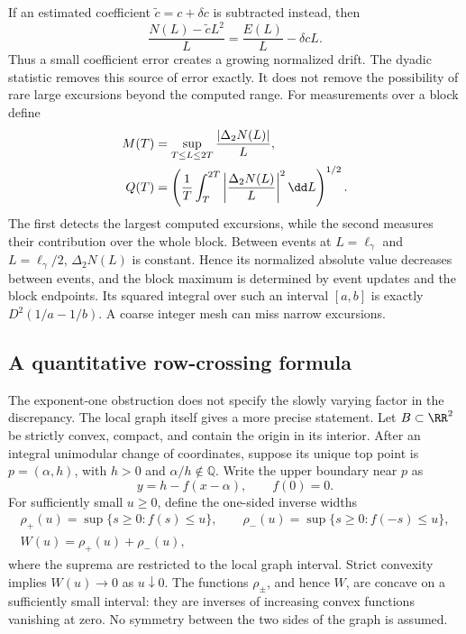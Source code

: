 If an estimated coefficient $\widetilde c=c+\delta c$ is subtracted
instead, then
\[
 \frac{N(L)-\widetilde cL^2}{L}
 =\frac{E(L)}L-\delta cL.
\]
Thus a small coefficient error creates a growing normalized drift. The
dyadic statistic removes this source of error exactly. It does not
remove the possibility of rare large excursions beyond the computed range.
For measurements over a block define
\begin{align}
 M(T)&=\sup_{T\le L\le2T}\frac{|\Delta_2N(L)|}{L},\notag\\
 Q(T)&=\left(\frac1T\int_T^{2T}
                    \left|\frac{\Delta_2N(L)}L\right|^2\dd L\right)^{1/2}.
 \label{eq:dyadicblockmetrics}
\end{align}
The first detects the largest computed excursions, while the second
measures their contribution over the whole block. Between events at
$L=\ell_\gamma$ and $L=\ell_\gamma/2$, $\Delta_2N(L)$ is constant.
Hence its normalized absolute value decreases between events, and
the block maximum is determined by event updates and the block endpoints.
Its squared integral over such an interval $[a,b]$ is exactly
$D^2(1/a-1/b)$. A coarse integer mesh can miss narrow excursions.


\subsection{A quantitative row-crossing formula}
\label{subsec:inverseflatness}

The exponent-one obstruction does not specify the slowly varying factor
in the discrepancy. The local graph itself gives a more precise statement.
Let $B\subset\RR^2$ be strictly convex, compact, and contain the origin in
its interior. After an integral unimodular change of coordinates, suppose
its unique top point is $p=(\alpha,h)$, with $h>0$ and
$\alpha/h\notin\mathbb Q$. Write the upper boundary near $p$ as
\[
 y=h-f(x-\alpha),\qquad f(0)=0.
\]
For sufficiently small $u\geq0$, define the one-sided inverse widths
\[
\begin{gathered}
 \rho_+(u)=\sup\{s\geq0:f(s)\leq u\},\qquad
 \rho_-(u)=\sup\{s\geq0:f(-s)\leq u\},\\
 W(u)=\rho_+(u)+\rho_-(u),
\end{gathered}
\]
where the suprema are restricted to the local graph interval. Strict
convexity implies $W(u)\to0$ as $u\downarrow0$. The functions
$\rho_\pm$, and hence $W$, are concave on a sufficiently small interval:
they are inverses of increasing convex functions vanishing at zero.
No symmetry between the two sides of the graph is assumed.

